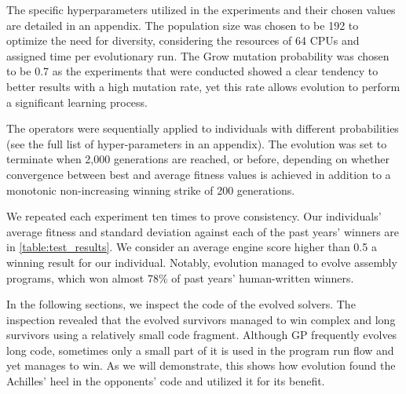 \documentclass[dvipsnames, format=sigconf]{acmart}
\begin{document}
The specific hyperparameters utilized in the experiments and their chosen values are detailed in an appendix. The population size was chosen to be 192 to optimize the need for diversity, considering the resources of 64 CPUs and assigned time per evolutionary run. The Grow mutation probability was chosen to be 0.7 as the experiments that were conducted showed a clear tendency to better results with a high mutation rate, yet this rate allows evolution to perform a significant learning process. 

The operators were sequentially applied to individuals with different probabilities (see the full list of hyper-parameters in an appendix). 
The evolution was set to terminate when 2,000 generations are reached, or before, depending on whether convergence between best and average fitness values is achieved in addition to a monotonic non-increasing winning strike of 200 generations.

We repeated each experiment ten times to prove consistency. Our individuals' average fitness and standard deviation against each of the past years' winners are in \autoref{table:test_results}. We consider an average engine score higher than 0.5 a winning result for our individual. Notably, evolution managed to evolve assembly programs, which won almost 78\% of past years' human-written winners.

In the following sections, we inspect the code of the evolved solvers. The inspection revealed that the evolved survivors managed to win complex and long survivors using a relatively small code fragment. Although GP frequently evolves long code, sometimes only a small part of it is used in the program run flow and yet manages to win. As we will demonstrate, this shows how evolution found the Achilles' heel in the opponents' code and utilized it for its benefit.
\end{document}
